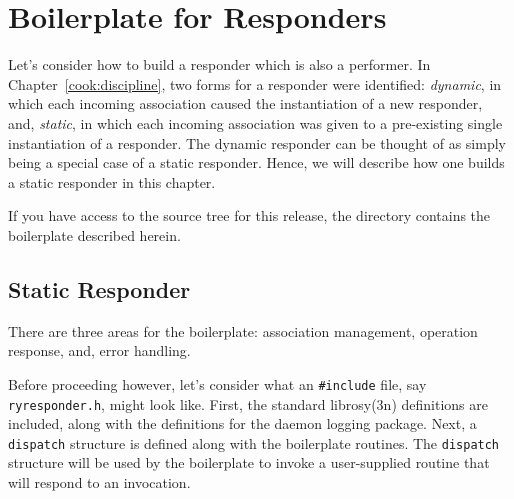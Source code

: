 
\chapter       {Boilerplate for Responders}\label{cook:responder}
Let's consider how to build a responder which is also a performer.
In Chapter~\ref{cook:discipline},
two forms for a responder were identified:
{\em dynamic},
in which each incoming association caused the instantiation of a new responder,
and,
{\em static},
in which each incoming association was given to a pre-existing single
instantiation of a responder.
The dynamic responder can be thought of as simply being a special case of a
static responder.
Hence,
we will describe how one builds a static responder in this chapter.

If you have access to the source tree for this release,
the directory  contains the boilerplate described herein.

\section	{Static Responder}
There are three areas for the boilerplate:
association management, operation response, and, error handling.

Before proceeding however,
let's consider what an \verb"#include" file, say \verb"ryresponder.h",
might look like.
First, the standard \man librosy(3n) definitions are included,
along with the definitions for the daemon logging package.
Next, a \verb"dispatch" structure is defined
along with the boilerplate routines.
The \verb"dispatch" structure will be used by the boilerplate to invoke a
user-supplied routine that will respond to an invocation.

\newpage
{}

